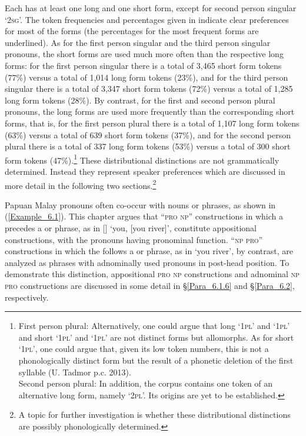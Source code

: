 Each  has at least one long and one short form, except for second person singular  ‘\textsc{2sg}’. The token frequencies and percentages given in  indicate clear preferences for most of the  forms (the percentages for the most frequent forms are underlined). As for the first person singular and the third person singular pronouns, the short forms are used much more often than the respective long forms: for the first person singular there is a total of 3,465 short form tokens (77\%) versus a total of 1,014 long form tokens (23\%), and for the third person singular there is a total of 3,347 short form tokens (72\%) versus a total of 1,285 long form tokens (28\%). By contrast, for the first and second person plural pronouns, the long forms are used more frequently than the corresponding short forms, that is, for the first person plural there is a total of 1,107 long form tokens (63\%) versus a total of 639 short form tokens (37\%), and for the second person plural there is a total of 337 long form tokens (53\%) versus a total of 300 short form tokens (47\%).\footnote{\label{Footnote_6.181} First person plural: Alternatively, one could argue that long  ‘\textsc{1pl}’ and  ‘\textsc{1pl}’ and short  ‘\textsc{1pl}’ and  ‘\textsc{1pl}’ are not distinct forms but allomorphs. As for short  ‘\textsc{1pl}’, one could argue that, given its low token numbers, this is not a phonologically distinct form but the result of a phonetic deletion of the first syllable  (U. Tadmor p.c. 2013).\\
Second person plural: In addition, the corpus contains one token of an alternative long form, namely  ‘\textsc{2pl}’. Its origins are yet to be established.} These distributional distinctions are not grammatically determined. Instead they represent speaker preferences which are discussed in more detail in the following two sections.\footnote{A topic for further investigation is whether these distributional distinctions are possibly phonologically determined.}


Papuan Malay pronouns often co-occur with nouns or  phrases, as shown in (\ref{Example_6.1}). This chapter argues that ``\textsc{pro} \textsc{np}'' constructions in which a  precedes a  or  phrase, as in [] ‘you, [you river]’, constitute appositional constructions, with the pronouns having pronominal function. ``\textsc{np} \textsc{pro}'' constructions in which the  follows a  or  phrase, as in  ‘you river’, by contrast, are analyzed as  phrases with adnominally used pronouns in post-head position. To demonstrate this distinction, appositional \textsc{pro} \textsc{np} constructions and adnominal \textsc{np} \textsc{pro} constructions are discussed in some detail in §\ref{Para_6.1.6} and §\ref{Para_6.2}, respectively.

